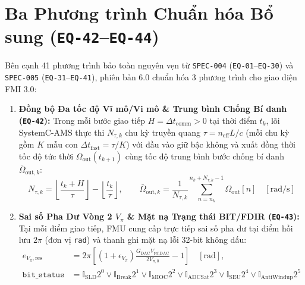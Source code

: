 \documentclass[11pt, a4paper]{article}
\begin{document}
\section{Ba Phương trình Chuẩn hóa Bổ sung (\texttt{EQ-42}--\texttt{EQ-44})}

Bên cạnh 41 phương trình bảo toàn nguyên vẹn từ \texttt{SPEC-004} (\texttt{EQ-01}--\texttt{EQ-30}) và \texttt{SPEC-005} (\texttt{EQ-31}--\texttt{EQ-41}), phiên bản 6.0 chuẩn hóa 3 phương trình cho giao diện FMI 3.0:

\begin{enumerate}
    \item \textbf{Đồng bộ Đa tốc độ Vĩ mô/Vi mô \& Trung bình Chống Bí danh (\texttt{EQ-42}):}
    Trong mỗi bước giao tiếp $H = \Delta t_{\text{comm}} > 0$ tại thời điểm $t_k$, lõi SystemC-AMS thực thi $N_{\tau,k}$ chu kỳ truyền quang $\tau = n_{\text{eff}}L/c$ (mỗi chu kỳ gồm $K$ mẫu con $\Delta t_{\text{fast}} = \tau/K$) với đầu vào giữ bậc không và xuất đồng thời tốc độ tức thời $\Omega_{\text{out}}(t_{k+1})$ cùng tốc độ trung bình bước chống bí danh $\bar{\Omega}_{\text{out},k}$:
    \begin{equation}
    N_{\tau,k} = \left\lfloor \frac{t_k + H}{\tau} \right\rfloor - \left\lfloor \frac{t_k}{\tau} \right\rfloor, \qquad
    \bar{\Omega}_{\text{out},k} = \frac{1}{N_{\tau,k}} \sum_{n=n_k}^{n_k+N_{\tau,k}-1} \Omega_{\text{out}}[n] \quad [\text{rad/s}]
    \label{eq:eq42_multirate}
    \end{equation}

    \item \textbf{Sai số Pha Dư Vòng 2 $V_\pi$ \& Mặt nạ Trạng thái BIT/FDIR (\texttt{EQ-43}):}
    Tại mỗi điểm giao tiếp, FMU cung cấp trực tiếp sai số pha dư tại điểm hồi lưu $2\pi$ (đơn vị \texttt{rad}) và thanh ghi mặt nạ lỗi 32-bit không dấu:
    \begin{equation}
    \begin{aligned}
    e_{V_\pi,\text{res}} &= 2\pi \left[ (1 + \epsilon_{V_\pi})\frac{G_{\text{DAC}} V_{\text{ref,DAC}}}{2 V_{\pi,0}} - 1 \right] \quad [\text{rad}], \\
    \texttt{bit\_status} &= \mathbb{I}_{\text{SLD}}2^0 \lor \mathbb{I}_{\text{Break}}2^1 \lor \mathbb{I}_{\text{MIOC}}2^2 \lor \mathbb{I}_{\text{ADCSat}}2^3 \lor \mathbb{I}_{\text{SEU}}2^4 \lor \mathbb{I}_{\text{AntiWindup}}2^5
    \end{aligned}
    \label{eq:eq43_evpi_bit}
    \end{equation}


\end{enumerate}
\end{document}
